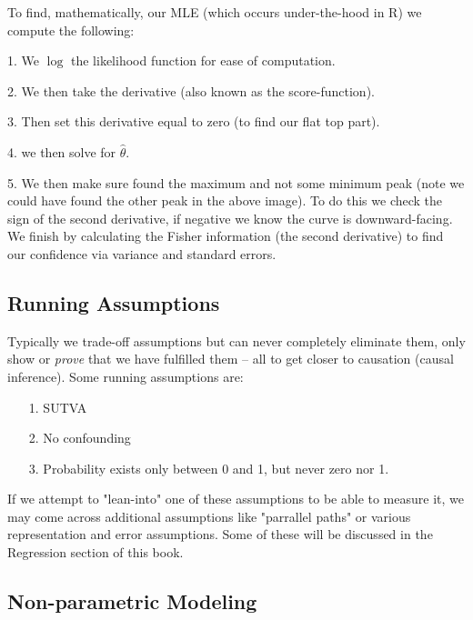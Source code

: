 \documentclass[12pt]{article}\usepackage[]{graphicx}\usepackage[]{color}
\begin{document}
\begin{flushleft}
\clearpage

To find, mathematically, our MLE (which occurs under-the-hood in R) we compute the following: 

\begin{list}{}{}
\item[1.] We $\log$ the likelihood function for ease of computation.
\item[2.] We then take the derivative (also known as the score-function).
\item[3.] Then set this derivative equal to zero (to find our flat top part).
\item[4.] we then solve for $\hat{\theta}$.
\item[5.] We then make sure found the maximum and not some minimum peak (note we could have found the other peak in the above image). To do this we check the sign of the second derivative, if negative we know the curve is downward-facing. We finish by calculating the Fisher information (the second derivative) to find our confidence via variance and standard errors.
\end{list}





\subsection{Running Assumptions}


Typically we trade-off assumptions but can never completely eliminate them, only show or \textit{prove} that we have fulfilled them -- all to get closer to causation (causal inference). Some running assumptions are:

\begin{itemize}
\item[1.] SUTVA
\item[2.] No confounding
\item[3.] Probability exists only between 0 and 1, but never zero nor 1.
\end{itemize}

\noindent If we attempt to "lean-into" one of these assumptions to be able to measure it, we may come across additional assumptions like "parrallel paths" or various representation and error assumptions. Some of these will be discussed in the Regression section of this book.


\subsection{Non-parametric Modeling}


\end{flushleft}
\end{document}
